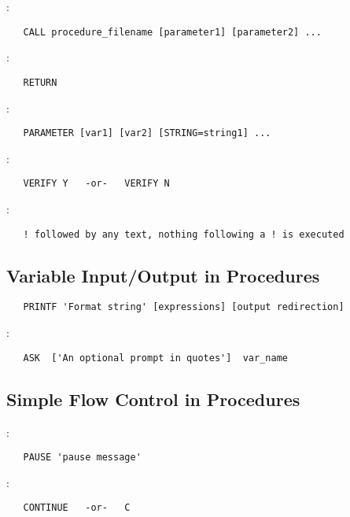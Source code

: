 \noindent {}:
\begin{verbatim}
   CALL procedure_filename [parameter1] [parameter2] ...
\end{verbatim}

\noindent {}:
\begin{verbatim}
   RETURN
\end{verbatim}

\noindent {}:
\begin{verbatim}
   PARAMETER [var1] [var2] [STRING=string1] ...
\end{verbatim}

\noindent {}:
\begin{verbatim}
   VERIFY Y   -or-   VERIFY N
\end{verbatim}

\noindent {}:
\begin{verbatim}
   ! followed by any text, nothing following a ! is executed
\end{verbatim}

\subsection{Variable Input/Output in Procedures}

\begin{verbatim}
   PRINTF 'Format string' [expressions] [output redirection]
\end{verbatim}

\noindent {}:
\begin{verbatim}
   ASK  ['An optional prompt in quotes']  var_name
\end{verbatim}

\subsection{Simple Flow Control in Procedures}

:
\begin{verbatim}
   PAUSE 'pause message'
\end{verbatim}

\noindent {}:
\begin{verbatim}
   CONTINUE   -or-   C
\end{verbatim}

